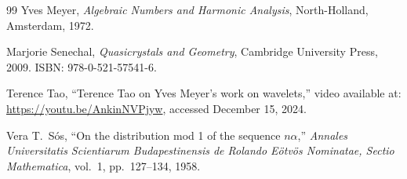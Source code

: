 \documentclass[11pt]{article}
\theoremstyle{plain}
\theoremstyle{definition}
\theoremstyle{remark}
\begin{document}
\begin{thebibliography}{99}
Yves Meyer,
\emph{Algebraic Numbers and Harmonic Analysis},
North-Holland, Amsterdam, 1972.

Marjorie Senechal,
\emph{Quasicrystals and Geometry},
Cambridge University Press, 2009.
ISBN: 978-0-521-57541-6.

Terence Tao,
``Terence Tao on Yves Meyer's work on wavelets,''
video available at: \url{https://youtu.be/AnkinNVPjyw}, accessed
December 15, 2024.

Vera T.\ S\'{o}s,
``On the distribution mod 1 of the sequence \(n\alpha\),''
\emph{Annales Universitatis Scientiarum Budapestinensis de Rolando
E\"{o}tv\"{o}s Nominatae, Sectio Mathematica}, vol.~1, pp.~127--134, 1958.

\end{thebibliography}
\end{document}

